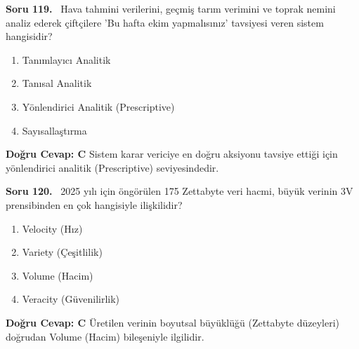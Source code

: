 \documentclass[11pt,a4paper,openany]{book}
\begin{document}
\needspace{5cm}
\vspace{8pt}
\noindent\textbf{\large\sffamily Soru 119.} \ Hava tahmini verilerini, geçmiş tarım verimini ve toprak nemini analiz ederek çiftçilere 'Bu hafta ekim yapmalısınız' tavsiyesi veren sistem hangisidir?
\begin{enumerate}[label=\Alph*), leftmargin=25pt, topsep=4pt, itemsep=2pt]
    \item Tanımlayıcı Analitik
    \item Tanısal Analitik
    \item Yönlendirici Analitik (Prescriptive)
    \item Sayısallaştırma
\end{enumerate}
\vspace{4pt}
\begin{tcolorbox}[title=Cevap ve Açıklama, colback=gray!3!white, colframe=primarycolor!90!black, arc=2mm, fonttitle=\bfseries\sffamily, top=6pt, bottom=6pt]
    \textbf{Doğru Cevap: C}
    \vspace{2pt}
    Sistem karar vericiye en doğru aksiyonu tavsiye ettiği için yönlendirici analitik (Prescriptive) seviyesindedir.
\end{tcolorbox}
\vspace{10pt}

\needspace{5cm}
\vspace{8pt}
\noindent\textbf{\large\sffamily Soru 120.} \ 2025 yılı için öngörülen 175 Zettabyte veri hacmi, büyük verinin 3V prensibinden en çok hangisiyle ilişkilidir?
\begin{enumerate}[label=\Alph*), leftmargin=25pt, topsep=4pt, itemsep=2pt]
    \item Velocity (Hız)
    \item Variety (Çeşitlilik)
    \item Volume (Hacim)
    \item Veracity (Güvenilirlik)
\end{enumerate}
\vspace{4pt}
\begin{tcolorbox}[title=Cevap ve Açıklama, colback=gray!3!white, colframe=primarycolor!90!black, arc=2mm, fonttitle=\bfseries\sffamily, top=6pt, bottom=6pt]
    \textbf{Doğru Cevap: C}
    \vspace{2pt}
    Üretilen verinin boyutsal büyüklüğü (Zettabyte düzeyleri) doğrudan Volume (Hacim) bileşeniyle ilgilidir.
\end{tcolorbox}
\vspace{10pt}
\end{document}
